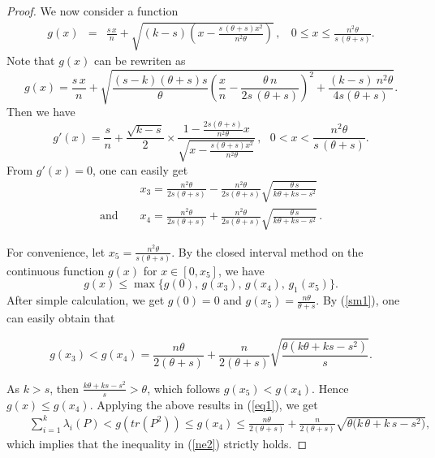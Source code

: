 \documentclass[12pt]{article}
\begin{document}
\begin{proof}
 \vspace*{3mm}

 \noindent
 We now consider a function
 \begin{eqnarray}
 g(x)&=&\frac{s\,x}{n}+\sqrt{(k-s)\left(x-\frac{s\,(\theta+s)x^2}{n^2\theta}\right)}\,,~~~~0\leq x\leq \frac{n^2\theta}{s\,(\theta+s)}.\nonumber
 \end{eqnarray}
 Note that $g(x)$ can be rewriten as
 \begin{equation}
g(x)=\frac{s\,x}{n}+\sqrt{\frac{(s-k)(\theta+s)s}{\theta}\left(\frac{x}{n}-\frac{\theta\,n}{2s\,(\theta+s)}\right)^2+\frac{(k-s)\
     n^2\theta}{4s(\theta+s)}}. \label{sm1}
 \end{equation}
  Then we have
 \begin{equation}
 g'(x)= \frac{s}{n}+\frac{\sqrt{k-s}}{2}\times\frac{\displaystyle{1-\frac{2s(\theta+s)}{n^2\theta}x}}{\sqrt{\displaystyle{x-\frac{s(\theta+s)x^2}{n^2\theta}}}}\,,~~~0<x<\frac{n^2\theta}{s\,(\theta+s)}.\nonumber
 \end{equation}
 From $g'(x)=0$, one can easily get
 \begin{eqnarray}
  &&x_3=\frac{n^2\theta}{2s(\theta+s)}-\frac{n^2\theta}{2s(\theta+s)}\sqrt{\frac{\theta\,s}{k\theta+ks-s^2}}\nonumber\\[2mm]
  \mbox{and }&&x_4=\frac{n^2\theta}{2s(\theta+s)}+\frac{n^2\theta}{2s(\theta+s)}\sqrt{\frac{\theta\,s}{k\theta+ks-s^2}}\,.\nonumber
 \end{eqnarray}

 \noindent
 For convenience, let $x_5=\displaystyle{\frac{n^2\theta}{s(\theta+s)}}$. By the closed interval method on the continuous function $g(x)$ for $x\in \left[0,x_5\right]$, we have
 $$g(x)\leq \max\Big\{g(0),\,g(x_3),\,g(x_4),\,g_1(x_5)\Big\}.$$
 After simple calculation, we get $g(0)=0$ and $g(x_5)=\frac{n\theta}{\theta+s}$. By (\ref{sm1}), one can easily obtain that

 $$g(x_3)<g(x_4)=\frac{n\theta}{2(\theta+s)}+\frac{n}{2(\theta+s)}
 \sqrt{\frac{\theta(k\theta+ks-s^2)}{s}}.$$


 \noindent
 As $k>s$, then $\frac{k\theta+ks-s^{2}}{s}>\theta$, which follows $g(x_5)<g(x_4)$. Hence $g(x)\leq g(x_4)$.
 Applying the above results in (\ref{eq1}), we get
  \begin{eqnarray}
 &&\sum_{i=1}^{k}\lambda_i(P)< g(tr(P^2))\leq g(x_4)\leq\frac{n\theta}{2(\theta+s)}+\frac{n}{2(\theta+s)}
   \sqrt{\theta\big(k\,\theta+k\,s-s^2\big)},\nonumber
 \end{eqnarray}
 which implies that the inequality in (\ref{ne2}) strictly holds.
\vspace*{3mm}


\end{proof}
\end{document}
